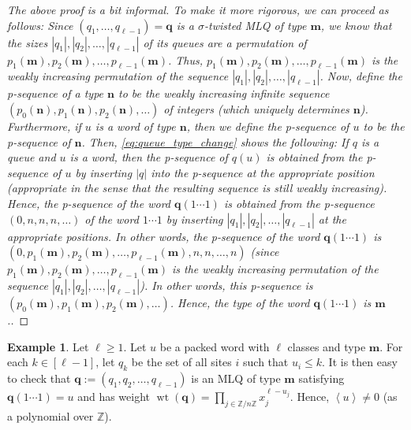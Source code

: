 \documentclass[reqno]{amsart}%
\newcommand{\0}{\phantom{c}}
\DeclareMathOperator{\wt}{wt}
\let\prodnonlimits\prod
\renewcommand{\prod}{\prodnonlimits\limits}
\newenvironment{verlong}{}{}
\newcommand{\defn}[1]{{\color{darkred}\emph{#1}}}
\theoremstyle{plain}
\theoremstyle{definition}
\newtheorem{example}[thm]{Example}
\numberwithin{equation}{section}
\begin{document}
\begin{verlong}
\begin{proof}
[The above proof is a bit informal. To make it more rigorous, we can proceed
as follows: Since $\left(  q_{1}, \ldots, q_{\ell-1} \right)  = \mathbf{q}$ is
a $\sigma$-twisted MLQ of type $\mathbf{m}$, we know that the sizes $\left|
q_{1} \right|  , \left|  q_{2} \right|  , \ldots, \left|  q_{\ell-1} \right|
$ of its queues are a permutation of $p_{1}(\mathbf{m}), p_{2}(\mathbf{m}),
\ldots, p_{\ell-1}(\mathbf{m})$. Thus, $p_{1}(\mathbf{m}), p_{2}(\mathbf{m}),
\ldots, p_{\ell-1}(\mathbf{m})$ is the weakly increasing permutation of the
sequence $\left|  q_{1} \right|  , \left|  q_{2} \right|  , \ldots, \left|
q_{\ell-1} \right|  $. Now, define the \defn{p-sequence} of a type
$\mathbf{n}$ to be the weakly increasing infinite sequence $\left(
p_{0}(\mathbf{n}), p_{1}(\mathbf{n}), p_{2}(\mathbf{n}), \ldots\right)  $ of
integers (which uniquely determines $\mathbf{n}$). Furthermore, if $u$ is a
word of type $\mathbf{n}$, then we define the p-sequence of $u$ to be the
p-sequence of $\mathbf{n}$. Then, \eqref{eq:queue_type_change} shows the
following: If $q$ is a queue and $u$ is a word, then the p-sequence of $q(u)$
is obtained from the p-sequence of $u$ by inserting $\left|  q \right|  $ into
the p-sequence at the appropriate position (appropriate in the sense that the
resulting sequence is still weakly increasing). Hence, the p-sequence of the
word $\mathbf{q} (1 \dotsm1)$ is obtained from the p-sequence $\left(  0, n,
n, n, \ldots\right)  $ of the word $1 \dotsm1$ by inserting $\left|  q_{1}
\right|  , \left|  q_{2} \right|  , \ldots, \left|  q_{\ell-1} \right|  $ at
the appropriate positions. In other words, the p-sequence of the word
$\mathbf{q} (1 \dotsm1)$ is $\left(  0, p_{1}(\mathbf{m}), p_{2}(\mathbf{m}),
\ldots, p_{\ell-1}(\mathbf{m}), n, n, \ldots, n \right)  $ (since
$p_{1}(\mathbf{m}), p_{2}(\mathbf{m}), \ldots, p_{\ell-1}(\mathbf{m})$ is the
weakly increasing permutation of the sequence $\left|  q_{1} \right|  ,
\left|  q_{2} \right|  , \ldots, \left|  q_{\ell-1} \right|  $). In other
words, this p-sequence is $\left(  p_{0}(\mathbf{m}), p_{1}(\mathbf{m}),
p_{2}(\mathbf{m}), \ldots\right)  $. Hence, the type of the word $\mathbf{q}
(1 \dotsm1)$ is $\mathbf{m}$.]
\end{proof}
\end{verlong}

\begin{example}
Let $\ell\geq1$. Let $u$ be a packed word with $\ell$ classes and type
$\mathbf{m}$. For each $k \in\left[  \ell-1 \right]  $, let $q_{k}$ be the set
of all sites $i$ such that $u_{i} \leq k$. It is then easy to check that
$\mathbf{q} := \left(  q_{1}, q_{2}, \ldots, q_{\ell-1} \right)  $ is an MLQ
of type $\mathbf{m}$ satisfying $\mathbf{q}(1 \dotsm1) = u$ and has weight
$\wt(\mathbf{q}) = \prod_{j \in\mathbb{Z} / n \mathbb{Z}} x_{j}^{\ell- u_{j}}%
$. Hence, $\left\langle u \right\rangle \neq0$ (as a polynomial over
$\mathbb{Z}$).
\end{example}
\end{document}
